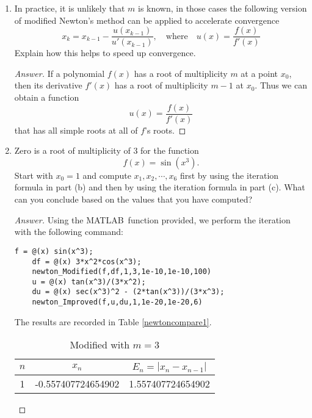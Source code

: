 \begin{enumerate}
\begin{proof}
\[		\frac{(x_{k-1}-x^*)h(x_{k-1})}{h(x_{k-1})+\frac{1}{m}(x_{k-1}-x^*)h'(x_{k-1})}. \]
		Define the error term \(E_k=x_k-x^*\), then
		\[ E_k = E_{k-1} \left( 1 - 
		\frac{1}{1+\frac{1}{m} E_{k-1}\frac{h'(x^*+E_{k-1})}{h(x^*+E_{k-1})}}\right). \]
		A first order approximation gives
		\[ E_k \approx E_{k-1}^2 \cdot
		\frac{h'(x^*+E_{k-1})}{m\cdot h(x^*+E_{k-1})}. \]
		So the quadratic convergence is proved.
	\end{proof}
	\item In practice, it is unlikely that $m$ is known, in those cases the following version of modified Newton's method can be applied to accelerate convergence
	\[ x_k=x_{k-1}-\frac{u(x_{k-1})}{u'(x_{k-1})}, \quad \text{where} \quad u(x)=\frac{f(x)}{f'(x)} \]
	Explain how this helps to speed up convergence.
	\begin{proof}[Answer]
		 If a polynomial \(f(x)\) has a root of multiplicity \(m\) at a point \(x_0\), then its derivative \(f'(x)\) has a root of multiplicity \(m-1\) at \(x_0\).
		 Thus we can obtain a function
		 \[ u(x)=\frac{f(x)}{f'(x)} \]
		 that  has  all  simple roots at all of \(f\)'s roots.
	\end{proof}
	\item Zero is a root of multiplicity of 3 for the function
	\[ f(x)=\sin(x^3). \]
	Start with \(x_0=1\) and compute \(x_1, x_2, \cdots, x_6\) first by using the iteration formula in part (b) and then by using the iteration formula in part (c).
	What can you conclude based on the values that you have computed?
	\begin{proof}[Answer]
	Using the MATLAB\texttrademark\ function provided, we perform the iteration with the following command:
	\begin{lstlisting}[style=Matlab-editor]
	f = @(x) sin(x^3);
	df = @(x) 3*x^2*cos(x^3);
	newton_Modified(f,df,1,3,1e-10,1e-10,100)
	u = @(x) tan(x^3)/(3*x^2);
	du = @(x) sec(x^3)^2 - (2*tan(x^3))/(3*x^3);
	newton_Improved(f,u,du,1,1e-20,1e-20,6)
	\end{lstlisting}
	The results are recorded in Table \ref{newtoncompare1}.
	\begin{table}[htbp]
		\begin{subtable}[t]{.49\linewidth}
			\centering
			\caption{Modified with \(m=3\)}
			\begin{tabular}[t]{|c|c|c|}
			\hline
			\normalsize	$n$	&	\normalsize	\(x_n\)	&	\normalsize	\(E_n=|x_n-x_{n-1}|\)	\\	\hline
			\scriptsize	1	&	\scriptsize	-0.557407724654902		&	\scriptsize	1.557407724654902	\\	\hline

\end{tabular}
\end{subtable}
\end{table}
\end{proof}
\end{enumerate}
